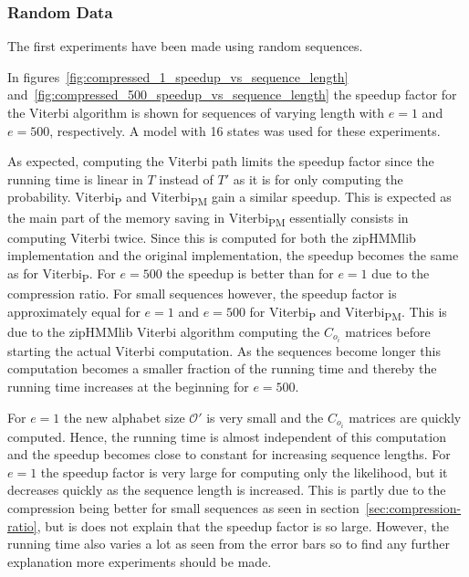 \subsubsection{Random Data}

The first experiments have been made using random sequences.

In figures~\ref{fig:compressed_1_speedup_vs_sequence_length}
and~\ref{fig:compressed_500_speedup_vs_sequence_length} the speedup factor for
the Viterbi algorithm is shown for sequences of varying length with $e = 1$ and
$e = 500$, respectively. A model with 16 states was used for these experiments.

As expected, computing the Viterbi path limits the speedup factor since the
running time is linear in $T$ instead of $T'$ as it is for only computing the
probability. Viterbi\textsubscript{P} and Viterbi\textsubscript{PM} gain a
similar speedup. This is expected as the main part of the memory saving in
Viterbi\textsubscript{PM} essentially consists in computing Viterbi twice.
Since this is computed for both the zipHMMlib implementation and the original
implementation, the speedup becomes the same as for Viterbi\textsubscript{P}.
For $e = 500$ the speedup is better than for $e = 1$ due to the compression
ratio. For small sequences however, the speedup factor is approximately equal
for $e = 1$ and $e = 500$ for Viterbi\textsubscript{P} and
Viterbi\textsubscript{PM}. This is due to the zipHMMlib Viterbi algorithm
computing the $C_{o_i}$ matrices before starting the actual Viterbi
computation. As the sequences become longer this computation becomes a smaller
fraction of the running time and thereby the running time increases at the
beginning for $e = 500$.

For $e = 1$ the new alphabet size $\mathcal{O'}$ is
very small and the $C_{o_i}$ matrices are quickly computed. Hence, the running
time is almost independent of this computation and the speedup becomes close to
constant for increasing sequence lengths. For $e = 1$ the speedup factor is
very large for computing only the likelihood, but it decreases quickly as the
sequence length is increased. This is partly due to the compression being
better for small sequences as seen in section~\ref{sec:compression-ratio}, but
is does not explain that the speedup factor is so large. However, the running
time also varies a lot as seen from the error bars so to find any further
explanation more experiments should be made.

